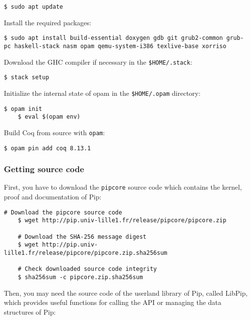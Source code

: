 \documentclass[10pt,a4paper,titlepage]{refart}
\begin{document}
\begin{lstlisting}[style=BashStyle]
    $ sudo apt update
\end{lstlisting}

Install the required packages:

\begin{lstlisting}[style=BashStyle]
    $ sudo apt install build-essential doxygen gdb git grub2-common grub-pc haskell-stack nasm opam qemu-system-i386 texlive-base xorriso
\end{lstlisting}

Download the GHC compiler if necessary in the \texttt{\$HOME/.stack}:

\begin{lstlisting}[style=BashStyle]
    $ stack setup
\end{lstlisting}

Initialize the internal state of opam in the \texttt{\$HOME/.opam} directory:

\begin{lstlisting}[style=BashStyle]
    $ opam init
    $ eval $(opam env)
\end{lstlisting}

Build Coq from source with \texttt{opam}:

\begin{lstlisting}[style=BashStyle]
    $ opam pin add coq 8.13.1
\end{lstlisting}

\subsubsection{Getting source code}

First, you have to download the \texttt{pipcore} source code which contains the
kernel, proof and documentation of Pip:

\begin{lstlisting}[style=BashStyle]
    # Download the pipcore source code
    $ wget http://pip.univ-lille1.fr/release/pipcore/pipcore.zip

    # Download the SHA-256 message digest
    $ wget http://pip.univ-lille1.fr/release/pipcore/pipcore.zip.sha256sum

    # Check downloaded source code integrity
    $ sha256sum -c pipcore.zip.sha256sum
\end{lstlisting}

Then, you may need the source code of the userland library of Pip, called
LibPip, which provides useful functions for calling the API or managing the data
structures of Pip:
\end{document}
